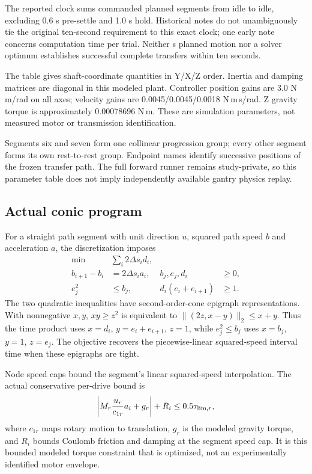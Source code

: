 The reported clock sums commanded planned segments from idle to idle, excluding 0.6 s pre-settle and 1.0 s hold. Historical notes do not unambiguously tie the original ten-second requirement to this exact clock; one early note concerns computation time per trial. Neither \GantryOptimisedTime{} s planned motion nor a solver optimum establishes successful complete transfers within ten seconds.

\begin{center}\scriptsize\end{center}
The table gives shaft-coordinate quantities in Y/X/Z order. Inertia and damping matrices are diagonal in this modeled plant. Controller position gains are 3.0 N\,m/rad on all axes; velocity gains are 0.0045/0.0045/0.0018 N\,m\,s/rad. Z gravity torque is approximately 0.00078696 N\,m. These are simulation parameters, not measured motor or transmission identification.
\begin{center}\small\end{center}
Segments six and seven form one collinear progression group; every other segment forms its own rest-to-rest group. Endpoint names identify successive positions of the frozen transfer path. The full forward runner remains study-private, so this parameter table does not imply independently available gantry physics replay.

\subsection{Actual conic program}
For a straight path segment with unit direction $u$, squared path speed $b$ and acceleration $a$, the discretization imposes
\begin{align}
 \min\ &\sum_i2\Delta s_i d_i,\nonumber\\
 b_{i+1}-b_i&=2\Delta s_i a_i,& b_j,e_j,d_i&\ge0,\\
 e_j^2&\le b_j,&d_i(e_i+e_{i+1})&\ge1.
\end{align}
The two quadratic inequalities have second-order-cone epigraph representations. With nonnegative $x,y$, $xy\ge z^2$ is equivalent to $\|(2z,x-y)\|_2\le x+y$. Thus the time product uses $x=d_i$, $y=e_i+e_{i+1}$, $z=1$, while $e_j^2\le b_j$ uses $x=b_j$, $y=1$, $z=e_j$. The objective recovers the piecewise-linear squared-speed interval time when these epigraphs are tight.

Node speed caps bound the segment's linear squared-speed interpolation. The actual conservative per-drive bound is
\begin{equation}
 \left|M_r\frac{u_r}{c_{1r}}a_i+g_r\right|+R_i
 \le0.5\tau_{{\rm lim},r},
\end{equation}
where $c_{1r}$ maps rotary motion to translation, $g_r$ is the modeled gravity torque, and $R_i$ bounds Coulomb friction and damping at the segment speed cap. It is this bounded modeled torque constraint that is optimized, not an experimentally identified motor envelope.

